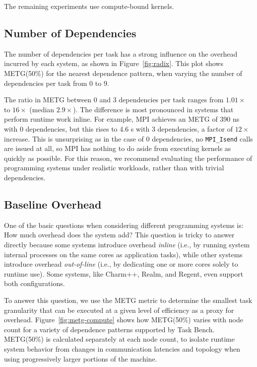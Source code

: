 The remaining experiments use compute-bound kernels.


\subsection{Number of Dependencies}
\label{subsec:number-of-dependencies}

The number of dependencies per task has a strong influence on the
overhead incurred by each system, as shown in
Figure~\ref{fig:radix}. This plot shows METG(50\%) for the nearest
dependence pattern, when varying the number of dependencies per task
from 0 to 9.



The ratio in METG between 0 and 3 dependencies per task ranges from
$1.01\times$ to $16\times$ (median $2.9\times$). The difference is most pronounced in systems that
perform runtime work inline. For example, MPI achieves an METG of 390
ns with 0 dependencies, but this rises to 4.6 \textmu{}s with 3 dependencies,
a factor of $12\times$ increase. This is unsurprising as in the case
of 0 dependencies, no \lstinline[language=C++]{MPI_Isend} calls are
issued at all, so MPI has nothing to do aside from executing kernels
as quickly as possible. For this reason, we recommend evaluating the performance of
programming systems under realistic workloads, rather than with
trivial dependencies.

\subsection{Baseline Overhead}

One of the basic questions when considering different programming
systems is: How much overhead does the system add? This question is tricky to answer directly because some systems introduce
overhead \emph{inline} (i.e., by running system internal processes on
the same cores as application tasks), while other systems introduce
overhead \emph{out-of-line} (i.e., by dedicating one or more cores
solely to runtime use). Some systems, like Charm++, Realm, and Regent,
even support both configurations.

To answer this question, we use the METG metric to determine the
smallest task granularity that can be executed at a given level of
efficiency as a proxy for overhead. Figure~\ref{fig:metg-compute}
shows how METG(50\%) varies with node count for a variety of
dependence patterns supported by Task Bench. METG(50\%) is calculated
separately at each node count, to isolate runtime system behavior from
changes in communication latencies and topology when using
progressively larger portions of the machine.

